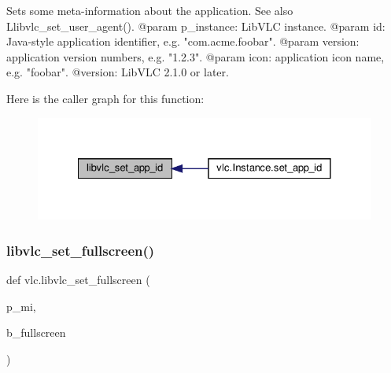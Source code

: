 \begin{DoxyVerb}Sets some meta-information about the application.
See also L{libvlc_set_user_agent}().
@param p_instance: LibVLC instance.
@param id: Java-style application identifier, e.g. "com.acme.foobar".
@param version: application version numbers, e.g. "1.2.3".
@param icon: application icon name, e.g. "foobar".
@version: LibVLC 2.1.0 or later.
\end{DoxyVerb}
 Here is the caller graph for this function\+:
\nopagebreak
\begin{figure}[H]
\begin{center}
\leavevmode
\includegraphics[width=328pt]{namespacevlc_a4d48c4354ffe3aa12ee4201cca0f0dac_icgraph}
\end{center}
\end{figure}
\mbox{\label{namespacevlc_a22a30fc3b5a348e7363b5ad4dba42564}} 
\subsubsection{\texorpdfstring{libvlc\+\_\+set\+\_\+fullscreen()}{libvlc\_set\_fullscreen()}}
{\footnotesize\ttfamily def vlc.\+libvlc\+\_\+set\+\_\+fullscreen (\begin{DoxyParamCaption}\item[{}]{p\+\_\+mi,  }\item[{}]{b\+\_\+fullscreen }\end{DoxyParamCaption})}

